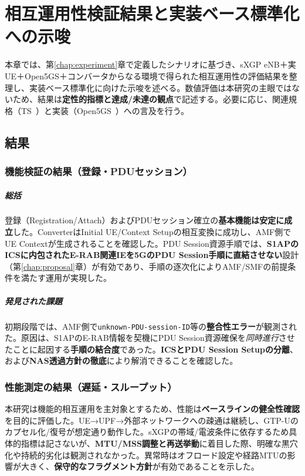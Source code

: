 \chapter{相互運用性検証結果と実装ベース標準化への示唆}
\label{chap:evaluation}

本章では、第\ref{chap:experiment}章で定義したシナリオに基づき、sXGP eNB＋実UE＋Open5GS＋コンバータからなる環境で得られた相互運用性の評価結果を整理し、実装ベース標準化に向けた示唆を述べる。数値評価は本研究の主眼ではないため、結果は\textbf{定性的指標と達成/未達の観点}で記述する。必要に応じ、関連規格（TS~\cite{threegpp-23501,threegpp-23502}）と実装（Open5GS~\cite{open5gs}）への言及を行う。

\section{結果}
\subsection{機能検証の結果（登録・PDUセッション）}
\paragraph{総括} 登録（Registration/Attach）およびPDUセッション確立の\textbf{基本機能は安定に成立}した。ConverterはInitial UE/Context Setupの相互変換に成功し、AMF側でUE Contextが生成されることを確認した。PDU Session資源手順では、\textbf{S1APのICSに内包されたE-RAB関連IEを5GのPDU Session手順に直結させない}設計（第\ref{chap:proposal}章）が有効であり、手順の逐次化によりAMF/SMFの前提条件を満たす運用が実現した。

\paragraph{発見された課題} 初期段階では、AMF側で\texttt{unknown-PDU-session-ID}等の\textbf{整合性エラー}が観測された。原因は、S1APのE-RAB情報を契機にPDU Session資源確保を\textit{同時進行}させたことに起因する\textbf{手順の結合度}であった。\textbf{ICSとPDU Session Setupの分離}、および\textbf{NAS透過方針の徹底}により解消できることを確認した。

\subsection{性能測定の結果（遅延・スループット）}
本研究は機能的相互運用を主対象とするため、性能は\textbf{ベースラインの健全性確認}を目的に評価した。UE→UPF→外部ネットワークへの疎通は継続し、GTP-Uのカプセル化/復号が想定通り動作した。sXGPの帯域/電波条件に依存するため具体的指標は記さないが、\textbf{MTU/MSS調整と再送挙動}に着目した際、明確な黒穴化や持続的劣化は観測されなかった。異常時はオフロード設定や経路MTUの影響が大きく、\textbf{保守的なフラグメント方針}が有効であることを示した。

